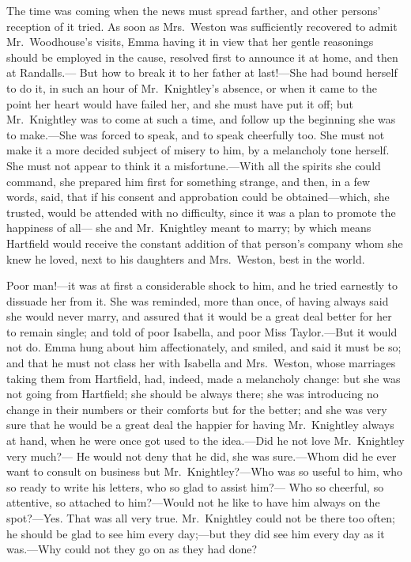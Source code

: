 The time was coming when the news must spread farther, and other persons'
reception of it tried.  As soon as Mrs.\ Weston was sufficiently
recovered to admit Mr.\ Woodhouse's visits, Emma having it in view
that her gentle reasonings should be employed in the cause,
resolved first to announce it at home, and then at Randalls.---%
But how to break it to her father at last!---She had bound herself
to do it, in such an hour of Mr.\ Knightley's absence, or when it
came to the point her heart would have failed her, and she must
have put it off; but Mr.\ Knightley was to come at such a time,
and follow up the beginning she was to make.---She was forced
to speak, and to speak cheerfully too.  She must not make it a more
decided subject of misery to him, by a melancholy tone herself.
She must not appear to think it a misfortune.---With all the spirits
she could command, she prepared him first for something strange,
and then, in a few words, said, that if his consent and approbation
could be obtained---which, she trusted, would be attended with
no difficulty, since it was a plan to promote the happiness of all---%
she and Mr.\ Knightley meant to marry; by which means Hartfield
would receive the constant addition of that person's company
whom she knew he loved, next to his daughters and Mrs.\ Weston,
best in the world.

Poor man!---it was at first a considerable shock to him, and he tried
earnestly to dissuade her from it.  She was reminded, more than once,
of having always said she would never marry, and assured that it
would be a great deal better for her to remain single; and told of
poor Isabella, and poor Miss Taylor.---But it would not do.  Emma hung
about him affectionately, and smiled, and said it must be so; and that
he must not class her with Isabella and Mrs.\ Weston, whose marriages
taking them from Hartfield, had, indeed, made a melancholy change:
but she was not going from Hartfield; she should be always there;
she was introducing no change in their numbers or their comforts but
for the better; and she was very sure that he would be a great deal
the happier for having Mr.\ Knightley always at hand, when he were once
got used to the idea.---Did he not love Mr.\ Knightley very much?---%
He would not deny that he did, she was sure.---Whom did he ever want
to consult on business but Mr.\ Knightley?---Who was so useful to him,
who so ready to write his letters, who so glad to assist him?---%
Who so cheerful, so attentive, so attached to him?---Would not he
like to have him always on the spot?---Yes.  That was all very true.
Mr.\ Knightley could not be there too often; he should be glad to see
him every day;---but they did see him every day as it was.---Why could
not they go on as they had done?

